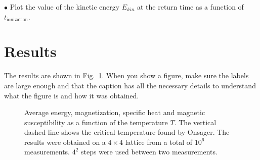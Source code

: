 \documentclass[a4paper,12pt]{article}
\begin{document}
$\bullet$ Plot the value of the kinetic energy $E_{kin}$ at the return time as a function of $t_{\mathrm{ionization}}$.\\




\section{Results}

The results are shown in Fig.~\ref{fig:averages}. When you show a figure, make
sure the labels are large enough and that the caption has all the necessary details
to understand what the figure is and how it was obtained.

\begin{figure}[H]
\begin{center}
%
%
\caption{Average energy, magnetization, specific heat and magnetic
susceptibility as a function of the temperature $T$.  The vertical dashed line
shows the critical temperature found by Onsager. The results were obtained
on a $4 \times 4$ lattice from a total of $10^6$ measurements. $4^2$ steps
were used between two measurements.}\label{fig:averages}
%
\end{center}
\end{figure}
\end{document}
